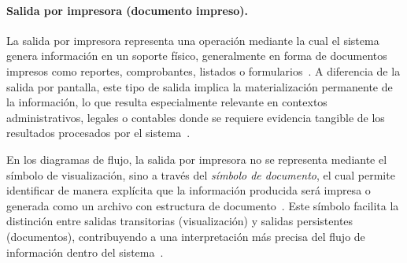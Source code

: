 \documentclass[12pt,twoside]{book}
\begin{document}
						\begin{figure}[h]
							\centering
							\label{fig:simbolo-visualizacion}
						\end{figure}
						
						\paragraph{Salida por impresora (documento impreso).}
						La salida por impresora representa una operación mediante la cual el sistema genera información en un soporte físico, generalmente en forma de documentos impresos como reportes, comprobantes, listados o formularios~\cite{Joyanes2007Fundamentos,Kendall2014Systems}. A diferencia de la salida por pantalla, este tipo de salida implica la materialización permanente de la información, lo que resulta especialmente relevante en contextos administrativos, legales o contables donde se requiere evidencia tangible de los resultados procesados por el sistema~\cite{Kendall2014Systems,Pressman2019Software}.
						
						En los diagramas de flujo, la salida por impresora no se representa mediante el símbolo de visualización, sino a través del \textit{símbolo de documento}, el cual permite identificar de manera explícita que la información producida será impresa o generada como un archivo con estructura de documento~\cite{Joyanes2007Fundamentos,SmartDrawFlowchartSymbols}. Este símbolo facilita la distinción entre salidas transitorias (visualización) y salidas persistentes (documentos), contribuyendo a una interpretación más precisa del flujo de información dentro del sistema~\cite{Manzano2017Programacion}.
						
\end{document}
